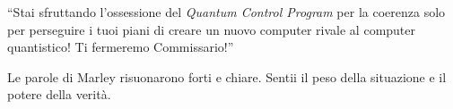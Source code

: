 \begin{center}
\begin{minipage}{0.7\textwidth}
    \centering
\end{minipage}
\end{center}



\begin{dialogue}
 \enquote{Stai sfruttando l'ossessione del \textit{Quantum Control Program} per la coerenza solo per perseguire i tuoi piani di creare un nuovo computer rivale al computer quantistico! Ti fermeremo Commissario!}
\end{dialogue}

Le parole di Marley risuonarono forti e chiare. Sentii il peso della situazione e il potere della verità.

